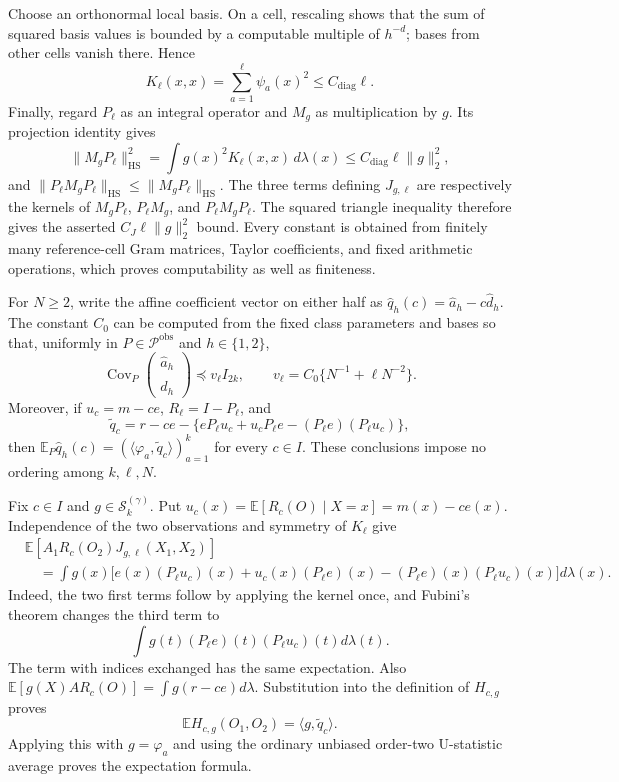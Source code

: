 Choose an orthonormal local basis.  On a cell, rescaling shows that the sum of squared basis values is bounded by a computable multiple of \(h^{-d}\); bases from other cells vanish there.  Hence
\[
 K_\ell(x,x)=\sum_{a=1}^{\ell}\psi_a(x)^2\le C_{\mathrm{diag}}\ell.
\]
Finally, regard \(P_\ell\) as an integral operator and \(M_g\) as multiplication by \(g\).  Its projection identity gives
\[
 \|M_gP_\ell\|_{\mathrm{HS}}^2
 =\int g(x)^2K_\ell(x,x)\,d\lambda(x)
 \le C_{\mathrm{diag}}\ell\|g\|_2^2,
\]
and \(\|P_\ell M_gP_\ell\|_{\mathrm{HS}}\le\|M_gP_\ell\|_{\mathrm{HS}}\).  The three terms defining \(J_{g,\ell}\) are respectively the kernels of \(M_gP_\ell\), \(P_\ell M_g\), and \(P_\ell M_gP_\ell\).  The squared triangle inequality therefore gives the asserted \(C_J\ell\|g\|_2^2\) bound.  Every constant is obtained from finitely many reference-cell Gram matrices, Taylor coefficients, and fixed arithmetic operations, which proves computability as well as finiteness.

For \(N\ge2\), write the affine coefficient vector on either half as \(\widehat q_h(c)=\widehat a_h-c\widehat d_h\).  The constant \(C_0\) can be computed from the fixed class parameters and bases so that, uniformly in \(P\in\mathcal P^{\mathrm{obs}}\) and \(h\in\{1,2\}\),
\[
 \operatorname{Cov}_P\!\begin{pmatrix}\widehat a_h\\ \widehat d_h\end{pmatrix}
 \preceq v_\ell I_{2k},\qquad
 v_\ell=C_0\{N^{-1}+\ell N^{-2}\}.
\]
Moreover, if \(u_c=m-ce\), \(R_\ell=I-P_\ell\), and
\[
 \widetilde q_c=r-ce-\{eP_\ell u_c+u_cP_\ell e-(P_\ell e)(P_\ell u_c)\},
\]
then \(\mathbb E_P\widehat q_h(c)=(\langle\varphi_a,\widetilde q_c\rangle)_{a=1}^k\) for every \(c\in I\).  These conclusions impose no ordering among \(k,\ell,N\).

Fix \(c\in I\) and \(g\in\mathcal S_k^{(\gamma)}\).  Put \(u_c(x)=\mathbb E[R_c(O)\mid X=x]=m(x)-ce(x)\).  Independence of the two observations and symmetry of \(K_\ell\) give
\[
\begin{aligned}
 &\mathbb E[A_1R_c(O_2)J_{g,\ell}(X_1,X_2)]\\
 &\quad=\int g(x)\bigl[e(x)(P_\ell u_c)(x)
       +u_c(x)(P_\ell e)(x)
       -(P_\ell e)(x)(P_\ell u_c)(x)\bigr]d\lambda(x).
\end{aligned}
\]
Indeed, the two first terms follow by applying the kernel once, and Fubini's theorem changes the third term to
\[
 \int g(t)(P_\ell e)(t)(P_\ell u_c)(t)d\lambda(t).
\]
The term with indices exchanged has the same expectation.  Also \(\mathbb E[g(X)AR_c(O)]=\int g(r-ce)d\lambda\).  Substitution into the definition of \(H_{c,g}\) proves
\[
 \mathbb E H_{c,g}(O_1,O_2)=\langle g,\widetilde q_c\rangle.
\]
Applying this with \(g=\varphi_a\) and using the ordinary unbiased order-two U-statistic average proves the expectation formula.

